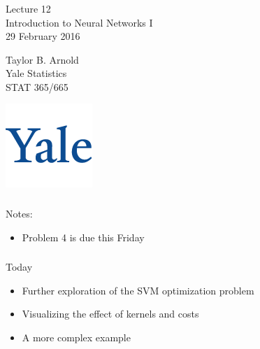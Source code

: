 \documentclass[xetex,mathserif,serif,aspectratio=169]{beamer}
\begin{document}
\begin{frame}[fragile] \frametitle{} \oldB \small

\vfill

{\fontsize{0.7cm}{0cm}\selectfont Lecture 12 \\\vspace{0.2cm} Introduction to Neural Networks I}\\\vspace{0.5cm}
29 February 2016

\vspace{2cm}

\begin{minipage}{0.6\textwidth}
Taylor B. Arnold \\
Yale Statistics \\
STAT 365/665
\end{minipage}
\hfill
\begin{minipage}{0.3\textwidth}\raggedleft
\includegraphics[scale=0.3]{../yale-logo.png}
\end{minipage}%

\end{frame}

\begin{frame}[fragile] \frametitle{} \oldB \small

Notes:
\begin{itemize}
\item Problem 4 is due this Friday
\end{itemize}

\end{frame}

\begin{frame}[fragile] \frametitle{} \oldB \small

Today
\begin{itemize}
\item Further exploration of the SVM optimization problem
\item Visualizing the effect of kernels and costs
\item A more complex example
\end{itemize}

\end{frame}
\end{document}
